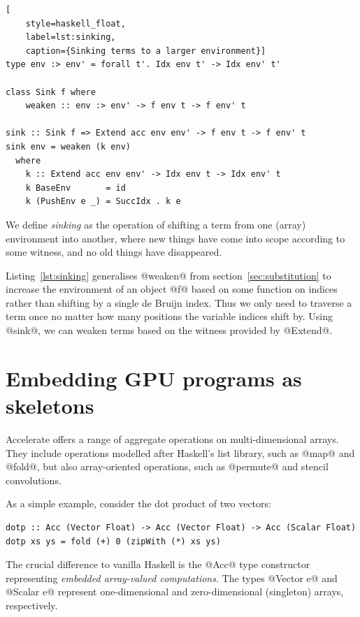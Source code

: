 \begin{lstlisting}[
    style=haskell_float,
    label=lst:sinking,
    caption={Sinking terms to a larger environment}]
type env :> env' = forall t'. Idx env t' -> Idx env' t'

class Sink f where
    weaken :: env :> env' -> f env t -> f env' t

sink :: Sink f => Extend acc env env' -> f env t -> f env' t
sink env = weaken (k env)
  where
    k :: Extend acc env env' -> Idx env t -> Idx env' t
    k BaseEnv       = id
    k (PushEnv e _) = SuccIdx . k e
\end{lstlisting}

We define \emph{sinking} as the operation of shifting a term from one (array)
environment into another, where new things have come into scope according to
some witness, and no old things have disappeared.

Listing~\ref{lst:sinking} generalises @weaken@ from
section~\ref{sec:substitution} to increase the environment of an object @f@
based on some function on indices rather than shifting by a single de Bruijn
index. Thus we only need to traverse a term once no matter how many positions
the variable indices shift by. Using @sink@, we can weaken terms based on the
witness provided by @Extend@.


\section{Embedding GPU programs as skeletons}
\label{sec:code_generation}

Accelerate offers a range of aggregate operations on multi-dimensional arrays.
They include operations modelled after Haskell's list library, such as
@map@ and @fold@, but also array-oriented operations, such as
@permute@ and stencil convolutions.

As a simple example, consider the dot product of two vectors:
%
\begin{lstlisting}[style=haskell]
dotp :: Acc (Vector Float) -> Acc (Vector Float) -> Acc (Scalar Float)
dotp xs ys = fold (+) 0 (zipWith (*) xs ys)
\end{lstlisting}
%
The crucial difference to vanilla Haskell is the @Acc@ type constructor
representing \emph{embedded array-valued computations}. The types
@Vector e@ and @Scalar e@ represent one-dimensional and
zero-dimensional (singleton) arrays, respectively.

